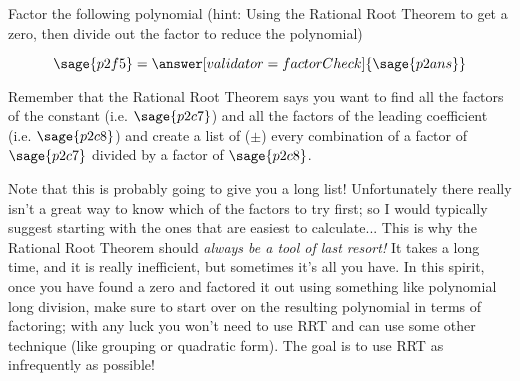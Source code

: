 \documentclass{ximera}
\begin{document}
\begin{problem}
    
    Factor the following polynomial (hint: Using the Rational Root Theorem to get a zero, then divide out the factor to reduce the polynomial)
    
    \[
        \sage{p2f5} = \answer[validator=factorCheck]{\sage{p2ans}}
    \]
    \begin{feedback}
        Remember that the Rational Root Theorem says you want to find all the factors of the constant (i.e. $\sage{p2c7}$) and all the factors of the leading coefficient (i.e. $\sage{p2c8}$) and create a list of ($\pm$) every combination of a factor of $\sage{p2c7}$ divided by a factor of $\sage{p2c8}$. 
        
        Note that this is probably going to give you a long list! Unfortunately there really isn't a great way to know which of the factors to try first; so I would typically suggest starting with the ones that are easiest to calculate... This is why the Rational Root Theorem should \textit{always be a tool of last resort!} It takes a long time, and it is really inefficient, but sometimes it's all you have. In this spirit, once you have found a zero and factored it out using something like polynomial long division, make sure to start over on the resulting polynomial in terms of factoring; with any luck you won't need to use RRT and can use some other technique (like grouping or quadratic form). The goal is to use RRT as infrequently as possible!
    \end{feedback}
    
\end{problem}
\end{document}
